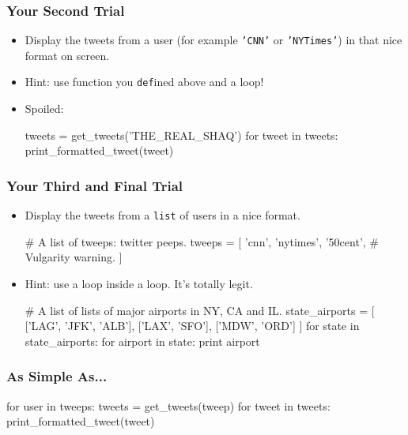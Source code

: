 \documentclass[10pt]{beamer}
\begin{document}
\begin{frame}[fragile]
  \frametitle{Your Second Trial}
  \begin{itemize}
    \item Display the tweets from a user (for example \texttt{'CNN'} or \texttt{'NYTimes'}) in that nice format on screen.
    \item Hint: use function you \texttt{def}ined above and a loop!
    \item<2> Spoiled:
      \begin{pythoncode}
  tweets = get_tweets('THE_REAL_SHAQ')
  for tweet in tweets:
    print_formatted_tweet(tweet)
      \end{pythoncode}
  \end{itemize}
\end{frame}

\begin{frame}[fragile]
  \frametitle{Your Third and Final Trial}
  \begin{itemize}
    \item Display the tweets from a \texttt{list} of users in a nice format.
      \begin{pythoncode}
  # A list of tweeps: twitter peeps.
  tweeps = [
    'cnn',
    'nytimes',
    '50cent', # Vulgarity warning.
  ]
      \end{pythoncode}
    \item Hint: use a loop inside a loop.
      It's totally legit.
      \footnotesize
      \begin{pythoncode}
  # A list of lists of major airports in NY, CA and IL.
  state_airports = [
    ['LAG', 'JFK', 'ALB'], 
    ['LAX', 'SFO'], ['MDW', 'ORD']
  ]
  for state in state_airports:
    for airport in state:
      print airport
      \end{pythoncode}
  \end{itemize}
\end{frame}

\begin{frame}[fragile]
  \frametitle{As Simple As...}
  \begin{pythoncode}
  for user in tweeps:
    tweets = get_tweets(tweep)
    for tweet in tweets:
      print_formatted_tweet(tweet)
  \end{pythoncode}
\end{frame}
\end{document}
